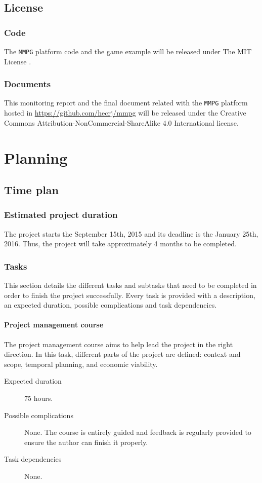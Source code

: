 \documentclass[a4paper,11pt,titlepage,abstract,numbers=noenddot,automark,mnsy,intlimits,rgb,dvipsnames]{report}
\begin{document}
\chapter{License}
\section{Code}
The \texttt{MMPG} platform code and the game example will be released under The MIT License \cite{mit_license}.
\section{Documents}
This monitoring report and the final document related with the \texttt{MMPG} platform hosted in
\url{https://github.com/hecrj/mmpg} will be released under the
Creative Commons Attribution-NonCommercial-ShareAlike 4.0 International \cite{cc_license} license.
\clearpage
\part{Planning}
\chapter{Time plan}
\section{Estimated project duration}
The project starts the September 15th, 2015 and its deadline is the January 25th, 2016. Thus,
the project will take approximately 4 months to be completed.
\section{Tasks}
This section details the different tasks and subtasks that need to be completed in order
to finish the project successfully. Every task is provided with a description, an expected duration,
possible complications and task dependencies.
\subsection{Project management course}
The project management course aims to help lead the project in the right direction. In this task,
different parts of the project are defined: context and scope, temporal planning, and
economic viability.
\begin{description}
\item[Expected duration]
75 hours.
\item[Possible complications]
None. The course is entirely guided and feedback is
  regularly provided to ensure the author can finish it properly.
\item[Task dependencies]
None.
\end{description}
\end{document}
